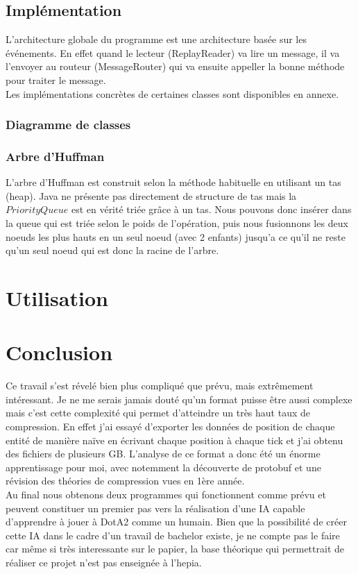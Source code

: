 \documentclass{article}
\begin{document}
\subsection{Implémentation}

L'architecture globale du programme est une architecture basée sur les événements. En effet quand le lecteur (ReplayReader) va lire un message, il va l'envoyer au routeur (MessageRouter) qui va ensuite appeller la bonne méthode pour traiter le message.\\

Les implémentations concrètes de certaines classes sont disponibles en annexe.

\subsubsection{Diagramme de classes}



\subsubsection{Arbre d'Huffman}

L'arbre d'Huffman est construit selon la méthode habituelle en utilisant un tas (heap). Java ne présente pas directement de structure de tas mais la $PriorityQueue$ est en vérité triée grâce à un tas. Nous pouvons donc insérer dans la queue qui est triée selon le poids de l'opération, puis nous fusionnons les deux noeuds les plus hauts en un seul noeud (avec 2 enfants) jusqu'a ce qu'il ne reste qu'un seul noeud qui est donc la racine de l'arbre.

\section{Utilisation}



\section{Conclusion}

Ce travail s'est révelé bien plus compliqué que prévu, mais extrêmement intéressant. Je ne me serais jamais douté qu'un format puisse être aussi complexe mais c'est cette complexité qui permet d'atteindre un très haut taux de compression. En effet j'ai essayé d'exporter les données de position de chaque entité de manière naïve en écrivant chaque position à chaque tick et j'ai obtenu des fichiers de plusieurs GB. L'analyse de ce format a donc été un énorme apprentissage pour moi, avec notemment la découverte de protobuf et une révision des théories de compression vues en 1ère année.\\
Au final nous obtenons deux programmes qui fonctionnent comme prévu et peuvent constituer un premier pas vers la réalisation d'une IA capable d'apprendre à jouer à DotA2 comme un humain. Bien que la possibilité de créer cette IA dans le cadre d'un travail de bachelor existe, je ne compte pas le faire car même si très interessante sur le papier, la base théorique qui permettrait de réaliser ce projet n'est pas enseignée à l'hepia.
\end{document}
